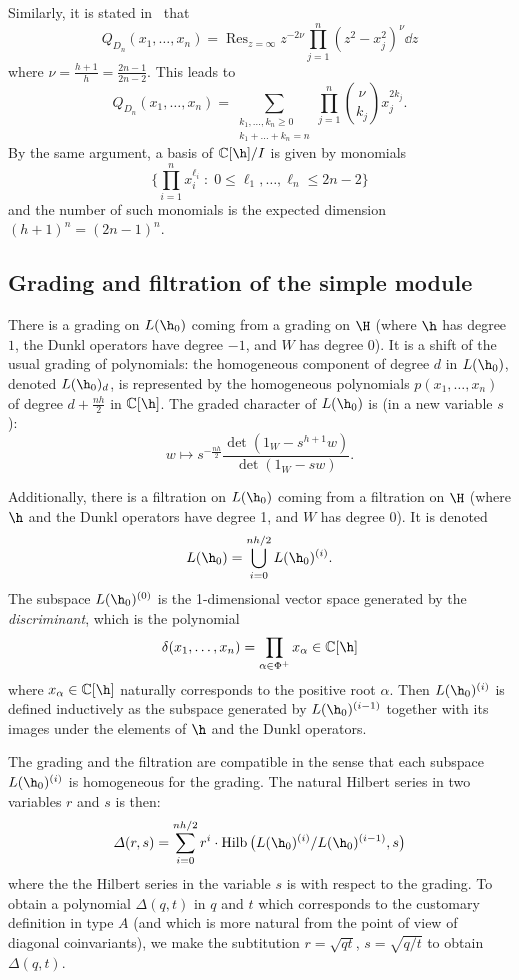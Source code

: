 \documentclass[11pt]{article}
\theoremstyle{definition}
\begin{document}
Similarly, it is stated in~\cite{feiginsilantyev} that
\[
    Q_{D_n} (x_1,\dots,x_n)
        =
    \operatorname{Res}_{z=\infty}
        z^{-2\nu} \prod_{j=1}^n (z^2 - x_j^2)^{\nu} \dd{z}
\]
where $\nu = \frac{h+1}{h} = \frac{2n-1}{2n-2}$.  This leads to 
\[
    Q_{D_n}(x_1,\dots,x_n)
        =
    \sum_{\substack{ k_1,\dots,k_n \geq 0 \\ k_1 + \dots + k_n = n}} \prod_{j=1}^n \binom{\nu}{k_j} x_j^{2k_j}.
\]
By the same argument, a basis of $\mathbb{C}[\h]/I$ is given by monomials
\[
    \Big\{
        \prod_{i=1}^n x_i^{\ell_i} 
        \;:\;
        0\leq \ell_1,\dots,\ell_n \leq 2n-2
    \Big\}
\]
and the number of such monomials is the expected dimension $(h+1)^n = (2n-1)^n$.

\subsection{Grading and filtration of the simple module}

There is a grading on $L(\h_0)$ coming from a grading on $\H$ (where $\h$ has degree $1$, the Dunkl operators have degree $-1$, and $W$ has degree $0$).  It is a shift of the usual grading of polynomials: the homogeneous component of degree $d$ in $L(\h_0)$, denoted $L(\h_0)_d$, is represented by the homogeneous polynomials $p(x_1,\dots,x_n)$ of degree $d + \frac{nh}{2}$ in $\mathbb{C}[\h]$.  The graded character of $L(\h_0)$ is (in a new variable $s$):
\[
    w \mapsto
    s^{-\frac{nh}{2}}\frac{\det(1_W - s^{h+1} w)}{ \det(1_W - s w)}.
\]

Additionally, there is a filtration on $L(\h_0)$ coming from a filtration on $\H$ (where $\h$ and the Dunkl operators have degree 1, and $W$ has degree $0$).  It is denoted
\[
    L(\h_0) = \bigcup_{i=0}^{nh/2} L(\h_0)^{(i)}. 
\]
The subspace $L(\h_0)^{(0)}$ is the 1-dimensional vector space generated by the {\it discriminant}, which is the polynomial
\[
    \delta(x_1,\dots,x_n) = \prod_{\alpha\in \Phi^+ } x_\alpha \in \mathbb{C}[\h]
\]
where $x_\alpha \in \mathbb{C}[\h]$ naturally corresponds to the positive root $\alpha$.  Then $L(\h_0)^{(i)}$ is defined inductively as the subspace generated by $L(\h_0)^{(i-1)}$ together with its images under the elements of $\h$ and the Dunkl operators.

The grading and the filtration are compatible in the sense that each subspace $L(\h_0)^{(i)}$ is homogeneous for the grading.  The natural Hilbert series in two variables $r$ and $s$ is then:
\[
    \varDelta(r,s) =
    \sum_{i=0}^{nh/2}
    r^i \cdot \operatorname{Hilb}\big(L(\h_0)^{(i)} / L(\h_0)^{(i-1)}, s\big)
\]
where the the Hilbert series in the variable $s$ is with respect to the grading.  To obtain a polynomial $\varDelta(q,t)$ in $q$ and $t$ which corresponds to the customary definition in type $A$ (and which is more natural from the point of view of diagonal coinvariants), we make the subtitution $r=\sqrt{qt}$, $s=\sqrt{q/t}$ to obtain $\varDelta(q,t)$.
\end{document}
